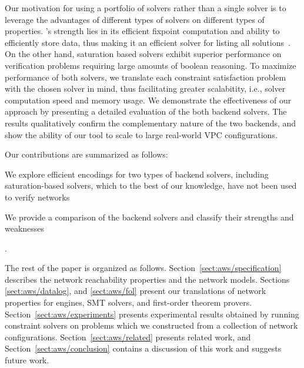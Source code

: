 Our motivation for using a portfolio of solvers rather than a single solver is to leverage the advantages of different types of solvers on different types of properties. \Datalog's strength lies in its efficient fixpoint computation and 
ability to efficiently store data, thus making it an efficient solver for listing all solutions~\cite{beliefs}. On the other hand, 
saturation based solvers exhibit superior performance on verification problems requiring large amounts of boolean reasoning. To 
maximize performance of both solvers, we translate each constraint satisfaction problem with the chosen solver in mind, thus 
facilitating greater scalabitity, i.e., solver computation speed and memory usage. We demonstrate the effectiveness 
of our approach by presenting a detailed evaluation of the both backend solvers. The results qualitatively confirm the complementary 
nature of the two backends, and show the ability of our tool to scale to large real-world VPC configurations.

Our contributions are summarized as follows: \begin{enumerate*}[label=(\roman*)]
\item We explore efficient encodings for two types of backend solvers, including 
saturation-based solvers, which to the best of our knowledge, have not been used to verify networks
\item We provide a comparison of the backend solvers and classify their strengths and weaknesses
\end{enumerate*}.

The rest of the paper is organized as follows. Section~\ref{sect:aws/specification} describes the network reachability properties and the network models. Sections \ref{sect:aws/datalog}, and \ref{sect:aws/fol} present our translations of network properties for \Datalog engines, SMT solvers, and first-order theorem provers. Section~\ref{sect:aws/experiments} presents experimental results obtained by running constraint solvers on problems which we constructed from a collection of network configurations. Section~\ref{sect:aws/related} presents related work, and Section~\ref{sect:aws/conclusion} contains a discussion of this work and suggests future work.


